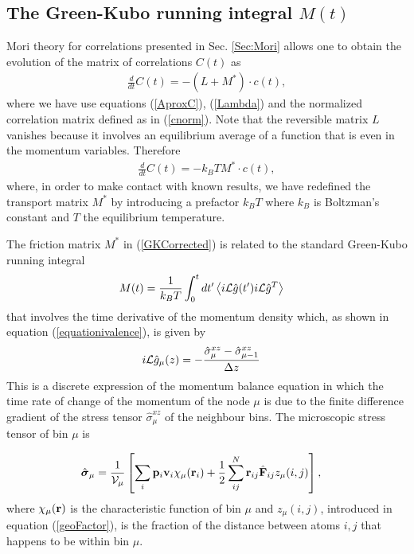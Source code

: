 \documentclass[b5paper,openright,10pt]{book}
\newcommand{\esc}{\!\cdot\!}
\newcommand{\llangle}{\left\langle}
\newcommand{\rrangle}{\right\rangle}
\begin{document}
\subsection{The Green-Kubo running integral $M(t)$}
Mori theory for correlations presented in Sec. \ref{Sec:Mori} allows one to obtain the evolution of the matrix of correlations $C(t)$ as
\begin{align}
    \frac{d}{dt}C(t) = -(L+M^*)\cdot c(t),
\end{align}
where we have use equations (\ref{AproxC}),  (\ref{Lambda}) and the normalized correlation matrix defined as in (\ref{cnorm}).
Note that the reversible matrix $L$ vanishes because it involves an equilibrium average of a function that is even in the momentum variables. Therefore
\begin{align}
    \frac{d}{dt}C(t) = -k_BTM^*\cdot c(t),
    \label{AproxCg}
\end{align}
where, in order to make contact  with known results, we have redefined
the transport  matrix $M^*$  by introducing  a prefactor  $k_BT$ where
$k_B$ is Boltzman's constant and $T$ the equilibrium temperature. 

The friction matrix $M^*$ in (\ref{GKCorrected}) is
related to the standard Green-Kubo running integral
\begin{align}
M(t)&=\frac{1}{k_BT}\int_0^{t}dt' \llangle i{\cal L}\hat{g}(t')i{\cal L}\hat{g}^T\rrangle
\label{Mmunu}
\end{align}
that  involves the  time
derivative of the  momentum density which, as shown  in equation (\ref{equationivalence}), is
given by
\begin{align}
  i{\cal L}  \hat{g}_{\mu}(z)&=-\frac{\hat{\sigma}^{xz}_{\mu}-\hat{\sigma}^{xz}_{\mu-1}}{\Delta z}
\label{iLAcurrentx}
\end{align}
This  is a  discrete expression  of the  momentum balance  equation in
which the time rate of change of the momentum of the node $\mu$ is due
to   the   finite   difference   gradient   of   the   stress   tensor
$\hat{\sigma}^{xz}_{\mu}$  of  the  neighbour bins.   The 
microscopic   stress   tensor   of  bin $\mu$ is 

\begin{align}
 \hat{ \boldsymbol{\sigma}}_{\mu}
&=
\frac{1}{{\cal V}_\mu} \left[\sum_i{\bf p}_i{\bf v}_i\chi_\mu({\bf r}_i)
+\frac{1}{2}\sum^{N}_{ij}{\bf r}_{ij}\hat{\bf F}_{ij}z_\mu(i,j)\right],
\label{sbin}
\end{align}
where $\chi_\mu({\bf r})$ is the  characteristic function of bin $\mu$
and $z_{\mu}(i,j)$, introduced in equation (\ref{geoFactor}), is the fraction of the distance between atoms $i,j$
that happens to be within bin $\mu$.
\end{document}
